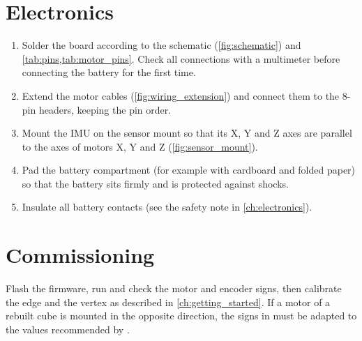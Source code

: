 \section{Electronics}

\begin{enumerate}
  \item Solder the board according to the schematic (\cref{fig:schematic}) and
        \cref{tab:pins,tab:motor_pins}. Check all connections with a multimeter before connecting
        the battery for the first time.
  \item Extend the motor cables (\cref{fig:wiring_extension}) and connect them to the 8-pin
        headers, keeping the pin order.
  \item Mount the IMU on the sensor mount so that its X, Y and Z axes are parallel to the axes of
        motors X, Y and Z (\cref{fig:sensor_mount}).
  \item Pad the battery compartment (for example with cardboard and folded paper) so that the
        battery sits firmly and is protected against shocks.
  \item Insulate all battery contacts (see the safety note in \cref{ch:electronics}).
\end{enumerate}

\section{Commissioning}

Flash the firmware, run  and check the motor and encoder signs, then calibrate the
edge and the vertex as described in \cref{ch:getting_started}. If a motor of a rebuilt cube is
mounted in the opposite direction, the signs in  must be adapted to the values
recommended by .

